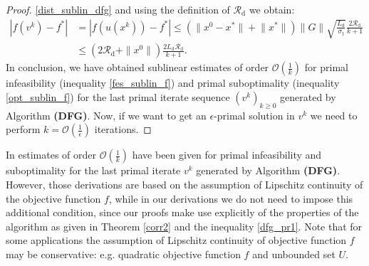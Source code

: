 \documentclass{gOMS2e}
\theoremstyle{plain}
\theoremstyle{definition}
\theoremstyle{remark}
\providecommand{\norm}[1]{\lVert#1\rVert}
\begin{document}
\begin{proof}
\eqref{dist_sublin_dfg} and using the definition of
$\mathcal{R}_\text{d}$ we obtain:
\begin{align}
\label{opt_sublin_f} |f(v^k)-f^*|  & = |f(u(x^k))-f^*| \le
\left(\norm{x^0-x^*} + \norm{x^*} \right) \|G\| \sqrt{\frac{
L_\text{d}}{\sigma_\text{f}}}
\frac{2\mathcal{R}_\text{d}}{k+1} \nonumber \\
& \leq (2\mathcal{R}_\text{d} + \| x^0\|)
\frac{2L_\text{d}\mathcal{R}_{\text{d}}}{k+1}.
\end{align}
\noindent In conclusion, we   have obtained sublinear estimates  of
order $\mathcal{O}(\frac{1}{k})$ for primal infeasibility
(inequality \eqref{fes_sublin_f}) and primal suboptimality
(inequality \eqref{opt_sublin_f}) for the last primal  iterate
sequence $(v^k)_{k \geq 0}$ generated by Algorithm \textbf{(DFG)}.
Now, if we want to get an $\epsilon$-primal solution in $v^k$ we
need to perform $k = {\mathcal O} (\frac{1}{\epsilon})$ iterations.
\end{proof}

\noindent In \cite{BecNed:14} estimates  of order
$\mathcal{O}(\frac{1}{k})$ have been given  for primal infeasibility
and suboptimality for the last primal  iterate $v^k$ generated by
Algorithm \textbf{(DFG)}.  However, those derivations are based on
the assumption of Lipschitz continuity of the objective function
$f$, while in our derivations we do not need to impose this
additional condition,  since our proofs make use explicitly of the
properties of the algorithm as given in Theorem \ref{corr2} and the
inequality \eqref{dfg_pr1}. Note that for some applications the
assumption of Lipschitz continuity of  objective function $f$ may be
conservative: e.g.  quadratic objective function $f$ and unbounded
set $U$.

\vspace{0.2cm}
\end{document}
